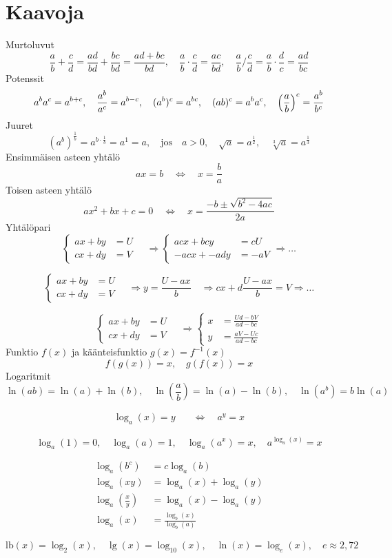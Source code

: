 \documentclass[12pt]{article}
\begin{document}
\section*{Kaavoja}

Murtoluvut
$$
\frac{a}{b}+\frac{c}{d}=\frac{ad}{bd}+\frac{bc}{bd}
=\frac{ad+bc}{bd},\quad 
\frac{a}{b}\cdot\frac{c}{d}=\frac{ac}{bd},\quad
\frac{a}{b}\bigg/\frac{c}{d}=\frac{a}{b}\cdot\frac{d}{c}=\frac{ad}{bc}
$$
Potenssit
$$
a^ba^c=a^{b+c},\quad 
\frac{a^b}{a^c}=a^{b-c},\quad 
(a^b)^c=a^{bc},\quad 
(ab)^c=a^ba^c,\quad 
\left(\frac{a}{b}\right)^c=\frac{a^b}{b^c}
$$
Juuret
$$
(a^b)^{\frac{1}{b}}=a^{b\cdot \frac{1}{b}}=a^1=a,\quad\textrm{jos}\quad a>0,\quad 
\sqrt{a}=a^{\frac{1}{2}},\quad \sqrt[3]{a}=a^{\frac{1}{3}}
$$
Ensimmäisen asteen yhtälö
$$
ax=b\quad\Leftrightarrow\quad x=\frac{b}{a}
$$
Toisen asteen yhtälö
$$
ax^2+bx+c=0\quad\Leftrightarrow\quad x=\frac{-b\pm\sqrt{b^2-4ac}}{2a}
$$
Yhtälöpari
$$
\begin{cases}
ax+by&=U\\
cx+dy&=V
\end{cases}\quad\Rightarrow
\begin{cases}
acx+bcy&=cU\\
-acx+-ady&=-aV
\end{cases}\Rightarrow\ldots
$$

$$
\begin{cases}
ax+by&=U\\
cx+dy&=V
\end{cases}\quad\Rightarrow
y=\frac{U-ax}{b}\quad\Rightarrow
cx+d\frac{U-ax}{b}=V\Rightarrow\ldots
$$

$$
\begin{cases}
ax+by&=U\\
cx+dy&=V
\end{cases}\quad\Rightarrow
\begin{cases}
x&=\frac{Ud-bV}{ad-bc}\\
y&=\frac{aV-Uc}{ad-bc}
\end{cases}
$$
Funktio $f(x)$ ja käänteisfunktio $g(x)=f^{-1}(x)$
$$
f(g(x))=x,\quad
g(f(x))=x
$$
Logaritmit
$$
\ln(ab)=\ln(a)+\ln(b),\quad
\ln(\frac{a}{b})=\ln(a)-\ln(b),\quad
\ln(a^b)=b\ln(a)
$$


\begin{equation*}
\begin{split}
\log_a(x)=y\quad&\Leftrightarrow\quad a^y=x
\end{split}
\end{equation*}


$$
\log_a(1)=0,\quad
\log_a(a)=1,\quad
\log_a(a^x)=x,\quad
a^{\log_a(x)}=x
$$

\begin{equation*}
\begin{split}
\log_a(b^c)&=c\log_a(b)\\
\log_a(xy)&=\log_a(x)+\log_a(y)\\
\log_a\left(\frac{x}{y}\right)
&=\log_a(x)-\log_a(y)\\
\log_a(x)&=\frac{\log_b(x)}{\log_b(a)}
\end{split}
\end{equation*}

$$
\textrm{lb}(x)=\log_2(x),\quad
\lg(x)=\log_{10}(x),\quad
\ln(x)=\log_e(x),\quad
e\approx 2,72
$$
\end{document}
